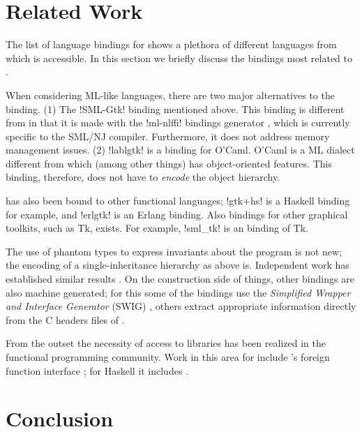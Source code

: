 \documentclass[workingdraft]{usetex-v1}
\begin{document}
\section{Related Work}
\label{sec:related-work}

The list of language bindings for \gtk shows a plethora of different
languages from which \gtk is accessible. In this section we briefly
discuss the bindings most related to \mgtk.

When considering ML-like languages, there are two major alternatives
to the \mgtk binding. (1) The !SML-Gtk! binding mentioned above.  This
binding is different from \mgtk in that it is made with the !ml-nlffi!
bindings generator \cite{Blume:2001:nlffi}, which is currently
specific to the SML/NJ compiler.  Furthermore, it does not address
memory management issues.
%
(2) !lablgtk! is a \gtk binding for O'Caml.
O'Caml is a ML dialect different from \sml which (among other things)
has object-oriented features. This binding, therefore, does not have
to \emph{encode} the \gtk object hierarchy.

\gtk has also been bound to other functional languages;
!gtk+hs! is a Haskell binding for example,
and !erlgtk! is an Erlang binding.
%
Also bindings for other graphical toolkits, such as Tk, exists.
For example, !sml_tk! is an \sml binding of Tk.

The use of phantom types to express invariants about the program
is not new; the encoding of a single-inheritance hierarchy as
above is. Independent work has established similar results
\cite{Fluet-Pucella:2002}. %
On the construction side of things, other bindings are also machine
generated; for this some of the bindings use the \emph{Simplified
  Wrapper and Interface Generator} (SWIG) \cite{Beazley:1996}, others
extract appropriate information directly from the C headers files of
\gtk.

From the outset the necessity of access to libraries has been realized
in the functional programming community. Work in this area for \sml
include 
\smlnj's foreign function interface \cite{Blume:2001:nlffi};
for Haskell it includes \cite{Finne:1999:CallingHellFromHeaven}.



\section{Conclusion}
\label{sec:conclusion}
\end{document}
